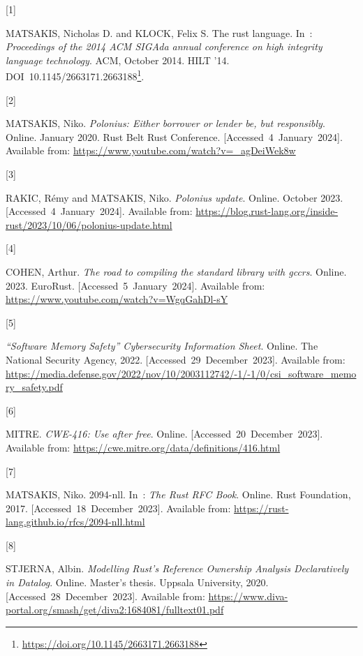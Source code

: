 \documentclass[
  11pt,
  twoside]{report}
\newlength{\cslhangindent}
\newlength{\csllabelwidth}
\newenvironment{CSLReferences}[2] %
 {\begin{list}{}{%
  \setlength{\itemindent}{0pt}
  \setlength{\leftmargin}{0pt}
  \setlength{\parsep}{0pt}
  \ifodd #1
   \setlength{\leftmargin}{\cslhangindent}
   \setlength{\itemindent}{-1\cslhangindent}
  \fi
  \setlength{\itemsep}{#2\baselineskip}}}
 {\end{list}}
\newcommand{\CSLLeftMargin}[1]{\parbox[t]{\csllabelwidth}{\strut#1\strut}}
\newcommand{\CSLRightInline}[1]{\parbox[t]{\linewidth - \csllabelwidth}{\strut#1\strut}}
\DeclareRobustCommand{\href}[2]{#2\footnote{\url{#1}}}
\begin{document}
\label{refs}
\begin{CSLReferences}{0}{1}
\CSLLeftMargin{{[}1{]} }%
\CSLRightInline{MATSAKIS, Nicholas D. and KLOCK, Felix S. The rust
language. In~: \emph{Proceedings of the 2014 ACM SIGAda annual
conference on high integrity language technology}. ACM, October 2014.
HILT '14.
DOI~\href{https://doi.org/10.1145/2663171.2663188}{10.1145/2663171.2663188}.
}

\CSLLeftMargin{{[}2{]} }%
\CSLRightInline{MATSAKIS, Niko. \emph{Polonius: Either borrower or
lender be, but responsibly}. Online. January 2020. Rust Belt Rust
Conference. {[}Accessed~4~January~2024{]}. Available from:
\url{https://www.youtube.com/watch?v=_agDeiWek8w}}

\CSLLeftMargin{{[}3{]} }%
\CSLRightInline{RAKIC, Rémy and MATSAKIS, Niko. \emph{Polonius update}.
Online. October 2023. {[}Accessed~4~January~2024{]}. Available from:
\url{https://blog.rust-lang.org/inside-rust/2023/10/06/polonius-update.html}}

\CSLLeftMargin{{[}4{]} }%
\CSLRightInline{COHEN, Arthur. \emph{The road to compiling the standard
library with gccrs}. Online. 2023. EuroRust.
{[}Accessed~5~January~2024{]}. Available from:
\url{https://www.youtube.com/watch?v=WgqGahDl-sY}}

\CSLLeftMargin{{[}5{]} }%
\CSLRightInline{\emph{{{``Software Memory Safety''}} {C}ybersecurity
{I}nformation {S}heet}. Online. The National Security Agency, 2022.
{[}Accessed~29~December~2023{]}. Available from:
\url{https://media.defense.gov/2022/nov/10/2003112742/-1/-1/0/csi_software_memory_safety.pdf}}

\CSLLeftMargin{{[}6{]} }%
\CSLRightInline{MITRE. \emph{CWE-416: Use after free}. Online.
{[}Accessed~20~December~2023{]}. Available from:
\url{https://cwe.mitre.org/data/definitions/416.html}}

\CSLLeftMargin{{[}7{]} }%
\CSLRightInline{MATSAKIS, Niko. 2094-nll. In~: \emph{The {R}ust {RFC}
{B}ook}. Online. Rust Foundation, 2017. {[}Accessed~18~December~2023{]}.
Available from: \url{https://rust-lang.github.io/rfcs/2094-nll.html}}

\CSLLeftMargin{{[}8{]} }%
\CSLRightInline{STJERNA, Albin. \emph{{M}odelling {R}ust's {R}eference
{O}wnership {A}nalysis {D}eclaratively in {D}atalog}. Online. Master's
thesis. Uppsala University, 2020. {[}Accessed~28~December~2023{]}.
Available from:
\url{https://www.diva-portal.org/smash/get/diva2:1684081/fulltext01.pdf}}


\end{CSLReferences}
\end{document}
